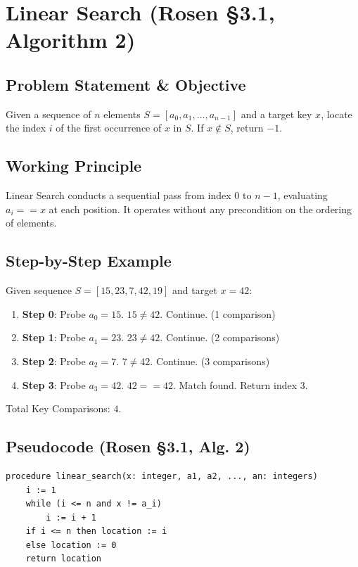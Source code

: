 \documentclass[11pt,a4paper,oneside]{report}
\theoremstyle{definition}
\begin{document}
\section{Linear Search (Rosen §3.1, Algorithm 2)}
\label{sec:linear_search}

\subsection{Problem Statement \& Objective}
Given a sequence of $n$ elements $S = [a_0, a_1, \dots, a_{n-1}]$ and a target key $x$, locate the index $i$ of the first occurrence of $x$ in $S$. If $x \notin S$, return $-1$.

\subsection{Working Principle}
Linear Search conducts a sequential pass from index $0$ to $n-1$, evaluating $a_i == x$ at each position. It operates without any precondition on the ordering of elements.

\subsection{Step-by-Step Example}
Given sequence $S = [15, 23, 7, 42, 19]$ and target $x = 42$:
\begin{enumerate}
    \item \textbf{Step 0}: Probe $a_0 = 15$. $15 \neq 42$. Continue. (1 comparison)
    \item \textbf{Step 1}: Probe $a_1 = 23$. $23 \neq 42$. Continue. (2 comparisons)
    \item \textbf{Step 2}: Probe $a_2 = 7$. $7 \neq 42$. Continue. (3 comparisons)
    \item \textbf{Step 3}: Probe $a_3 = 42$. $42 == 42$. Match found. Return index $3$.
\end{enumerate}
Total Key Comparisons: $4$.

\subsection{Pseudocode (Rosen §3.1, Alg. 2)}
\begin{lstlisting}[caption={Pseudocode: Linear Search (Rosen §3.1, Algorithm 2)}]
procedure linear_search(x: integer, a1, a2, ..., an: integers)
    i := 1
    while (i <= n and x != a_i)
        i := i + 1
    if i <= n then location := i
    else location := 0
    return location
\end{lstlisting}
\end{document}
